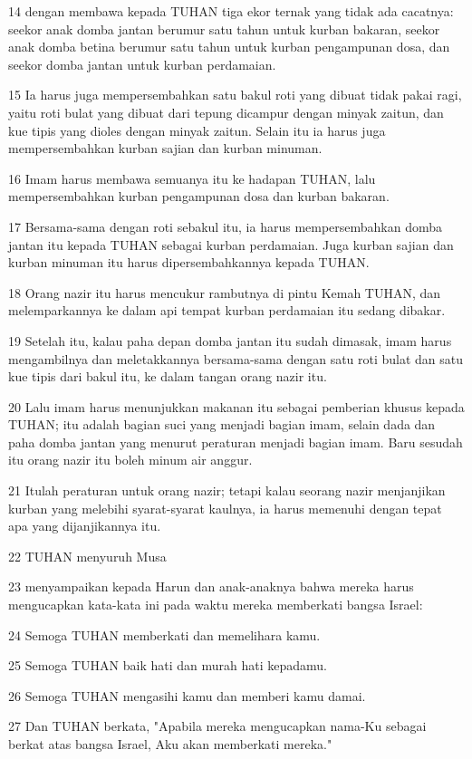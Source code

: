 \par 14 dengan membawa kepada TUHAN tiga ekor ternak yang tidak ada cacatnya: seekor anak domba jantan berumur satu tahun untuk kurban bakaran, seekor anak domba betina berumur satu tahun untuk kurban pengampunan dosa, dan seekor domba jantan untuk kurban perdamaian.
\par 15 Ia harus juga mempersembahkan satu bakul roti yang dibuat tidak pakai ragi, yaitu roti bulat yang dibuat dari tepung dicampur dengan minyak zaitun, dan kue tipis yang dioles dengan minyak zaitun. Selain itu ia harus juga mempersembahkan kurban sajian dan kurban minuman.
\par 16 Imam harus membawa semuanya itu ke hadapan TUHAN, lalu mempersembahkan kurban pengampunan dosa dan kurban bakaran.
\par 17 Bersama-sama dengan roti sebakul itu, ia harus mempersembahkan domba jantan itu kepada TUHAN sebagai kurban perdamaian. Juga kurban sajian dan kurban minuman itu harus dipersembahkannya kepada TUHAN.
\par 18 Orang nazir itu harus mencukur rambutnya di pintu Kemah TUHAN, dan melemparkannya ke dalam api tempat kurban perdamaian itu sedang dibakar.
\par 19 Setelah itu, kalau paha depan domba jantan itu sudah dimasak, imam harus mengambilnya dan meletakkannya bersama-sama dengan satu roti bulat dan satu kue tipis dari bakul itu, ke dalam tangan orang nazir itu.
\par 20 Lalu imam harus menunjukkan makanan itu sebagai pemberian khusus kepada TUHAN; itu adalah bagian suci yang menjadi bagian imam, selain dada dan paha domba jantan yang menurut peraturan menjadi bagian imam. Baru sesudah itu orang nazir itu boleh minum air anggur.
\par 21 Itulah peraturan untuk orang nazir; tetapi kalau seorang nazir menjanjikan kurban yang melebihi syarat-syarat kaulnya, ia harus memenuhi dengan tepat apa yang dijanjikannya itu.
\par 22 TUHAN menyuruh Musa
\par 23 menyampaikan kepada Harun dan anak-anaknya bahwa mereka harus mengucapkan kata-kata ini pada waktu mereka memberkati bangsa Israel:
\par 24 Semoga TUHAN memberkati dan memelihara kamu.
\par 25 Semoga TUHAN baik hati dan murah hati kepadamu.
\par 26 Semoga TUHAN mengasihi kamu dan memberi kamu damai.
\par 27 Dan TUHAN berkata, "Apabila mereka mengucapkan nama-Ku sebagai berkat atas bangsa Israel, Aku akan memberkati mereka."

